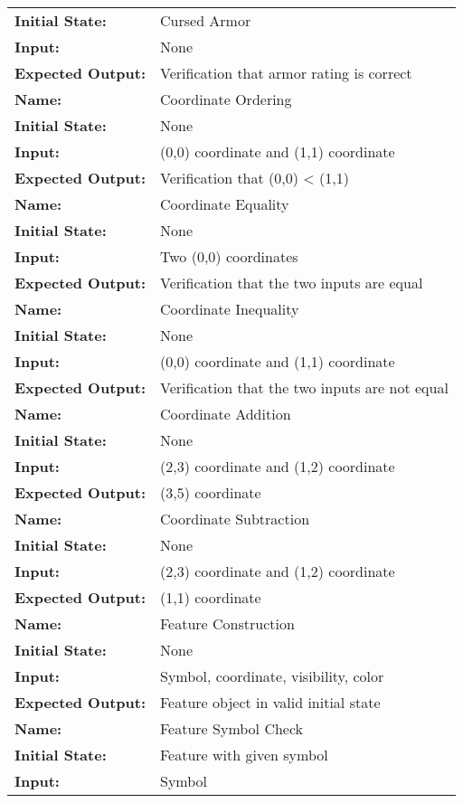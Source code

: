 \documentclass[12pt, titlepage]{article}
\begin{document}
\begin{center}
\begin{longtable}{ l | l }
\textbf{Initial State:} & Cursed Armor\\
\textbf{Input:} & None\\
\textbf{Expected Output:} & Verification that armor rating is correct\\
\hline
\textbf{Name:} & Coordinate Ordering\\
\textbf{Initial State:} & None\\
\textbf{Input:} & (0,0) coordinate and (1,1) coordinate\\
\textbf{Expected Output:} & Verification that (0,0) < (1,1)\\
\hline
\textbf{Name:} & Coordinate Equality\\
\textbf{Initial State:} & None\\
\textbf{Input:} & Two (0,0) coordinates\\
\textbf{Expected Output:} & Verification that the two inputs are equal\\
\hline
\textbf{Name:} & Coordinate Inequality\\
\textbf{Initial State:} & None\\
\textbf{Input:} & (0,0) coordinate and (1,1) coordinate\\
\textbf{Expected Output:} & Verification that the two inputs are not equal\\
\hline
\textbf{Name:} & Coordinate Addition\\
\textbf{Initial State:} & None\\
\textbf{Input:} & (2,3) coordinate and (1,2) coordinate\\
\textbf{Expected Output:} & (3,5) coordinate\\
\hline
\textbf{Name:} & Coordinate Subtraction\\
\textbf{Initial State:} & None\\
\textbf{Input:} & (2,3) coordinate and (1,2) coordinate\\
\textbf{Expected Output:} & (1,1) coordinate\\
\hline
\textbf{Name:} & Feature Construction\\
\textbf{Initial State:} & None\\
\textbf{Input:} & Symbol, coordinate, visibility, color\\
\textbf{Expected Output:} & Feature object in valid initial state\\
\hline
\textbf{Name:} & Feature Symbol Check\\
\textbf{Initial State:} & Feature with given symbol\\
\textbf{Input:} & Symbol\\

\end{longtable}
\end{center}
\end{document}
